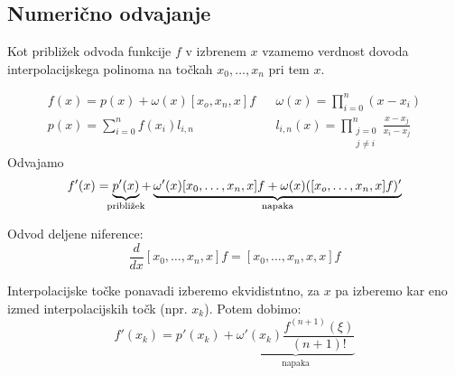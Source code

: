 \begin{multicols}{5}
\section*{Numerično odvajanje}
Kot približek odvoda funkcije $f$ v izbrenem $x$ vzamemo verdnost dovoda interpolacijskega
polinoma na točkah $x_0, \dots, x_n$ pri tem $x$.

\begin{align*}
    f(x) = p(x) + \omega(x)[x_o, x_n, x]f && \omega(x) = \prod_{i=0}^n (x-x_i) \\
    p(x) = \sum_{i=0}^n f(x_i) l_{i,n} && l_{i,n}(x) = \prod_{\substack{j=0 \\ j \neq i}}^n \frac{x-x_j}{x_i - x_j}
\end{align*}
Odvajamo 
\[
f'(x) = 
\underbrace{p'(x)}_{\mathclap{\text{približek}}} + 
\underbrace{\omega'(x)[x_0, \dots, x_n, x] f + \omega(x)([x_o, \dots, x_n, x] f)'}_{\text{napaka}}
\]

Odvod deljene niference:
\[ \frac{d}{dx} [x_0, \dots, x_n, x] f = [x_0, \dots, x_n, x, x] f\]

Interpolacijske točke ponavadi izberemo ekvidistntno, za $x$ pa izberemo kar eno izmed
interpolacijskih točk (npr. $x_k$). Potem dobimo:
\[ 
    f'(x_k) = p'(x_k) + 
    \underbrace{\omega'(x_k) \frac{f^{(n+1)}(\xi)}{(n+1)!}}_{\text{napaka}}
\]
\end{multicols}
